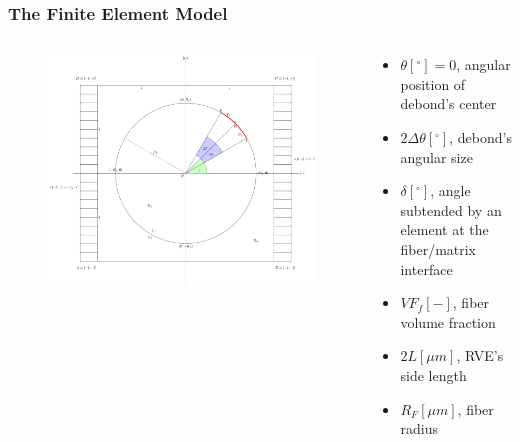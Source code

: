 \documentclass[first,firstsupp,lastsupp,last,hyperref,table]{ETHclass}
\begin{document}
\begin{frame}
\frametitle{\small The Finite Element Model}
\vspace{-0.5cm}
\centering
\begin{columns}
\begin{column}{0.6\textwidth}
\begin{figure}
\includegraphics[width=\columnwidth]{FEMfiberMatrixInterfaceProblem.pdf}
  \label{fig:jintegral}
\end{figure}
\end{column}
\begin{column}{0.4\textwidth}
\tiny
\begin{itemize}[label=]
\item $\theta\left[^{\circ}\right]=0$, angular position of debond's center\\[5pt]
\item $2\Delta\theta\left[^{\circ}\right]$, debond's angular size\\[5pt]
\item $\delta\left[^{\circ}\right]$, angle subtended by an element at the fiber/matrix interface\\[5pt]
\item $VF_{f}\left[-\right]$, fiber volume fraction\\[5pt]
\item $2L\left[\mu m\right]$, RVE's side length\\[5pt]
\item $R_{F}\left[\mu m\right]$, fiber radius\\[5pt]

\end{itemize}
\end{column}
\end{columns}
\end{frame}
\end{document}
